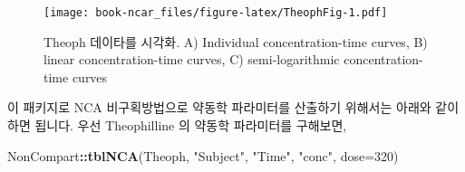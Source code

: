 \documentclass[]{krantz}
\makeatletter
\newenvironment{Shaded}{\begin{snugshade}}{\end{snugshade}}
\newcommand{\KeywordTok}[1]{\textcolor[rgb]{0.13,0.29,0.53}{\textbf{#1}}}
\newcommand{\DataTypeTok}[1]{\textcolor[rgb]{0.13,0.29,0.53}{#1}}
\newcommand{\DecValTok}[1]{\textcolor[rgb]{0.00,0.00,0.81}{#1}}
\newcommand{\StringTok}[1]{\textcolor[rgb]{0.31,0.60,0.02}{#1}}
\newcommand{\OperatorTok}[1]{\textcolor[rgb]{0.81,0.36,0.00}{\textbf{#1}}}
\newcommand{\NormalTok}[1]{#1}
\newenvironment{kframe}{%
\medskip{}
\setlength{\fboxsep}{.8em}
 \def\at@end@of@kframe{}%
 \ifinner\ifhmode%
  \def\at@end@of@kframe{\end{minipage}}%
  \begin{minipage}{\columnwidth}%
 \fi\fi%
 \def\FrameCommand##1{\hskip\@totalleftmargin \hskip-\fboxsep
 \colorbox{shadecolor}{##1}\hskip-\fboxsep
     \hskip-\linewidth \hskip-\@totalleftmargin \hskip\columnwidth}%
 \MakeFramed {\advance\hsize-\width
   \@totalleftmargin\z@ \linewidth\hsize
   \@setminipage}}%
 {\par\unskip\endMakeFramed%
 \at@end@of@kframe}
\renewenvironment{Shaded}{\begin{kframe}}{\end{kframe}}
\theoremstyle{definition}
\theoremstyle{definition}
\theoremstyle{definition}
\theoremstyle{remark}
\makeatother
\begin{document}
\begin{figure}
\centering
\texttt{[image: book-ncar\_files/figure-latex/TheophFig-1.pdf]}
\caption{\label{fig:TheophFig}Theoph 데이타를 시각화. A) Individual
concentration-time curves, B) linear concentration-time curves, C)
semi-logarithmic concentration-time curves}
\end{figure}

이 패키지로 NCA 비구획방법으로 약동학 파라미터를 산출하기 위해서는
아래와 같이 하면 됩니다. 우선 Theophilline 의 약동학 파라미터를
구해보면,

\begin{Shaded}
\begin{Highlighting}[]
\NormalTok{NonCompart}\OperatorTok{::}\KeywordTok{tblNCA}\NormalTok{(Theoph, }\StringTok{"Subject"}\NormalTok{, }\StringTok{"Time"}\NormalTok{, }\StringTok{"conc"}\NormalTok{, }\DataTypeTok{dose=}\DecValTok{320}\NormalTok{)}
\end{Highlighting}
\end{Shaded}
\end{document}
